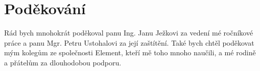 \section*{Poděkování}

Rád bych mnohokrát poděkoval panu Ing. Janu Ježkovi za vedení mé ročníkové práce
a panu Mgr. Petru Ustohalovi za její zaštítění. Také bych chtěl poděkovat mým
kolegům ze společnosti Element, kteří mě toho mnoho naučili, a mé rodině a
přátelům za dlouhodobou podporu.
